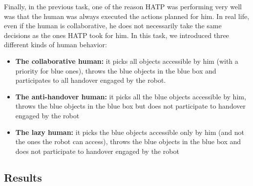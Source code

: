 \documentclass[english,a4paper,11pt,twoside]{StyleThese}
\begin{document}
Finally, in the previous task, one of the reason HATP was performing very well was that the human was always executed the actions planned for him. In real life, even if the human is collaborative, he does not necessarily take the same decisions as the ones HATP took for him. In this task, we introduced three different kinds of human behavior:
\begin{itemize}
\item \textbf{The collaborative human:} it picks all objects accessible by him (with a priority for blue ones), throws the blue objects in the blue box and participates to all handover engaged by the robot.
\item \textbf{The anti-handover human:} it picks all the blue objects accessible by him, throws the blue objects in the blue box but does not participate to handover engaged by the robot
\item \textbf{The lazy human:} it picks the blue objects accessible only by him (and not the ones the robot can access), throws the blue objects in the blue box and does not participate to handover engaged by the robot
\end{itemize}

\subsection{Results}
\end{document}
